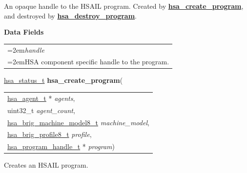 \documentclass[final]{book}
\newcommand{\hsaarg}[1]{\textit{#1}}
\newcommand{\reffun}[1]{\textbf{#1}}
\newcommand{\reffld}[1]{\textit{#1}}
\begin{document}
\begin{appendices}
\begin{tcolorbox}[breakable,nobeforeafter,arc=0mm,colframe=white,colback=lightgray,left=0mm]
\end{tcolorbox}
An opaque handle to the HSAIL program. Created by \hyperlink{group--HsailLinkerServiceLayer-1ga31af226a3f072a2977218d7c6a7a0dd0}{\reffun{hsa_create_program}}, and destroyed by \hyperlink{group--HsailLinkerServiceLayer-1gada57f0a1d9e7d0ec665c36c1a5d2aa30}{\reffun{hsa_destroy_program}}.

\noindent\textbf{Data Fields}\\[-6mm]
\begin{longtable}{@{}>{\hangindent=2em}p{\textwidth}}
\reffld{handle}\\\hspace{2em}HSA component specific handle to the program.
\end{longtable}



\noindent\begin{tcolorbox}[breakable,nobeforeafter,colframe=white,colback=lightgray,left=0mm]
\hyperlink{group--status-1gad755322e7ff95456520e8abdbe90d225}{hsa_status_t} \hypertarget{group--HsailLinkerServiceLayer-1ga31af226a3f072a2977218d7c6a7a0dd0}{\textbf{hsa_create_program}}(
\vspace{-3.5mm}\begin{longtable}{@{}p{\textwidth}}
\hspace{1.7em}\hyperlink{group--topology-1gab8db3fb886332a24acac08ec361e1d86}{hsa_agent_t} * \hsaarg{agents},\\
\hspace{1.7em}uint32_t \hsaarg{agent_count},\\
\hspace{1.7em}\hyperlink{group--FinalizerCoreApi-1ga01e2332dea5d847b0ef97d6a943965f0}{hsa_brig_machine_model8_t} \hsaarg{machine_model},\\
\hspace{1.7em}\hyperlink{group--FinalizerCoreApi-1ga4c295feab0936078f4331549de995db6}{hsa_brig_profile8_t} \hsaarg{profile},\\
\hspace{1.7em}\hyperlink{group--HsailLinkerServiceLayer-1ga7b28ca39da981be49aac99608eb386cb}{hsa_program_handle_t} * \hsaarg{program})\end{longtable}

\end{tcolorbox}
Creates an HSAIL program.


\end{appendices}
\end{document}
